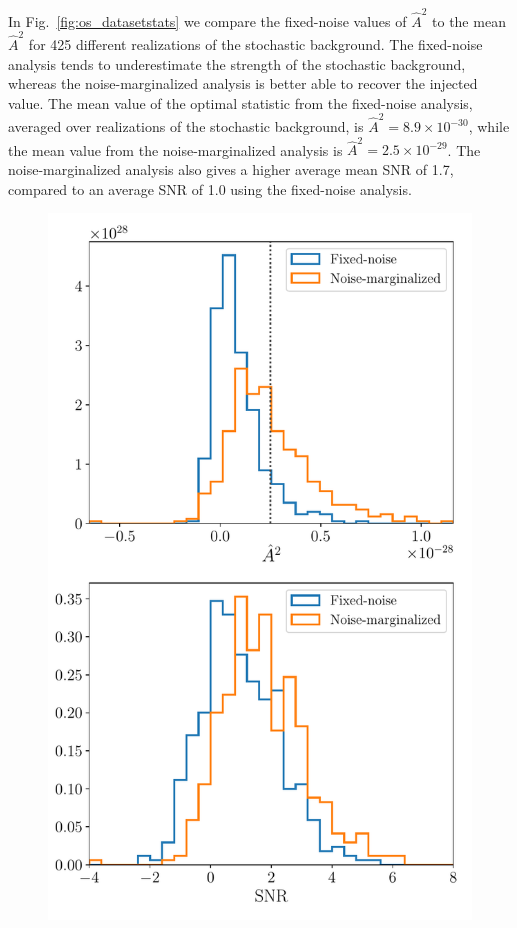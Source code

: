 \documentclass[twocolumn,aps,prd,superscriptaddress]{revtex4-1}
\begin{document}
In Fig.~\ref{fig:os_datasetstats} we compare the fixed-noise values of $\hat{A}^2$ 
to the mean $\hat{A}^2$ for 425 different realizations of the stochastic background. 
The fixed-noise analysis tends to underestimate the strength of the stochastic background, 
whereas the noise-marginalized analysis is better able to recover the injected value. 
The mean value of the optimal statistic from the fixed-noise analysis, 
averaged over realizations of the stochastic background, is $\hat{A}^2 = 8.9 \times 10^{-30}$, 
while the mean value from the noise-marginalized analysis is $\hat{A}^2 = 2.5 \times 10^{-29}$. 
The noise-marginalized analysis also gives a higher average mean SNR of 1.7, 
compared to an average SNR of 1.0 using the fixed-noise analysis.
\begin{figure}[ht]
	\includegraphics[width=0.9\columnwidth]{plots/os_datasetstats_5e-15.pdf}

\end{figure}
\end{document}
